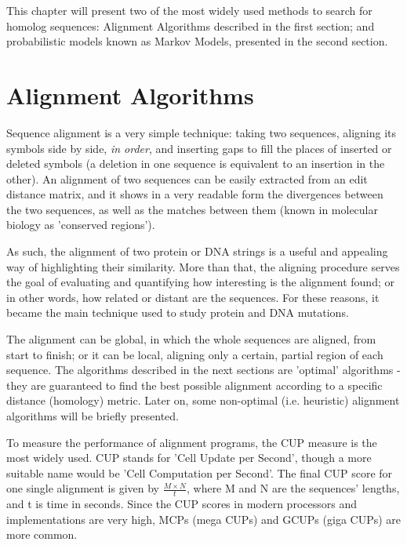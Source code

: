 


This chapter will present two of the most widely used methods to search for homolog sequences: Alignment Algorithms described in the first section; and probabilistic models known as Markov Models, presented in the second section.



\section{Alignment Algorithms}

Sequence alignment is a very simple technique: taking two sequences, aligning its symbols side by side, \emph{in order}, and inserting gaps to fill the places of inserted or deleted symbols (a deletion in one sequence is equivalent to an insertion in the other). An alignment of two sequences can be easily extracted from an edit distance matrix, and it shows in a very readable form the divergences between the two sequences, as well as the matches between them (known in molecular biology as 'conserved regions').

As such, the alignment of two protein or DNA strings is a useful and appealing way of highlighting their similarity. More than that, the aligning procedure serves the goal of evaluating and quantifying how interesting is the alignment found; or in other words, how related or distant are the sequences. For these reasons, it became the main technique used to study protein and DNA mutations.

The alignment can be global, in which the whole sequences are aligned, from start to finish; or it can be local, aligning only a certain, partial region of each sequence. The algorithms described in the next sections are 'optimal' algorithms - they are guaranteed to find the best possible alignment according to a specific distance (homology) metric. Later on, some non-optimal (i.e. heuristic) alignment algorithms will be briefly presented.

To measure the performance of alignment programs, the CUP measure is the most widely used. CUP stands for 'Cell Update per Second', though a more suitable name would be 'Cell Computation per Second'. The final CUP score for one single alignment is given by $\frac{M \times N}{t}$, where M and N are the sequences' lengths, and t is time in seconds. Since the CUP scores in modern processors and implementations are very high, MCPs (mega CUPs) and GCUPs (giga CUPs) are more common.



